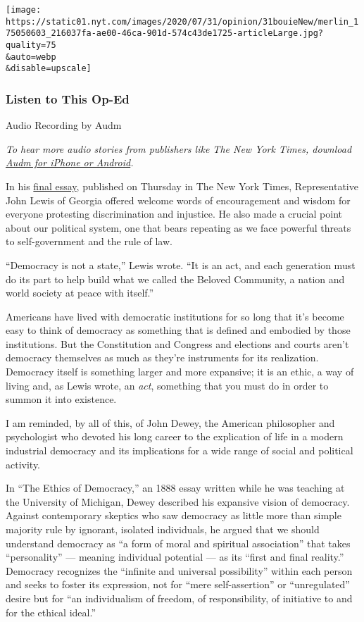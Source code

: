 \texttt{[image: https://static01.nyt.com/images/2020/07/31/opinion/31bouieNew/merlin\_175050603\_216037fa-ae00-46ca-901d-574c43de1725-articleLarge.jpg?quality=75\\\&auto=webp\\\&disable=upscale]}

\hypertarget{listen-to-this-op-ed}{%
\subsubsection{Listen to This Op-Ed}\label{listen-to-this-op-ed}}

Audio Recording by Audm

\emph{To hear more audio stories from publishers like The New York
Times, download}
\href{https://www.audm.com/?utm_source=nytopinion\&utm_medium=embed\&utm_campaign=trump_democracy_lewis}{\emph{Audm
for iPhone or Android}}\emph{.}

In his
\href{https://www.nytimes.com/2020/07/30/opinion/john-lewis-civil-rights-america.html}{final
essay}, published on Thursday in The New York Times, Representative John
Lewis of Georgia offered welcome words of encouragement and wisdom for
everyone protesting discrimination and injustice. He also made a crucial
point about our political system, one that bears repeating as we face
powerful threats to self-government and the rule of law.

``Democracy is not a state,'' Lewis wrote. ``It is an act, and each
generation must do its part to help build what we called the Beloved
Community, a nation and world society at peace with itself.''

Americans have lived with democratic institutions for so long that it's
become easy to think of democracy as something that is defined and
embodied by those institutions. But the Constitution and Congress and
elections and courts aren't democracy themselves as much as they're
instruments for its realization. Democracy itself is something larger
and more expansive; it is an ethic, a way of living and, as Lewis wrote,
an \emph{act}, something that you must do in order to summon it into
existence.

I am reminded, by all of this, of John Dewey, the American philosopher
and psychologist who devoted his long career to the explication of life
in a modern industrial democracy and its implications for a wide range
of social and political activity.

In ``The Ethics of Democracy,'' an 1888 essay written while he was
teaching at the University of Michigan, Dewey described his expansive
vision of democracy. Against contemporary skeptics who saw democracy as
little more than simple majority rule by ignorant, isolated individuals,
he argued that we should understand democracy as ``a form of moral and
spiritual association'' that takes ``personality'' --- meaning
individual potential --- as its ``first and final reality.'' Democracy
recognizes the ``infinite and universal possibility'' within each person
and seeks to foster its expression, not for ``mere self-assertion'' or
``unregulated'' desire but for ``an individualism of freedom, of
responsibility, of initiative to and for the ethical ideal.''

